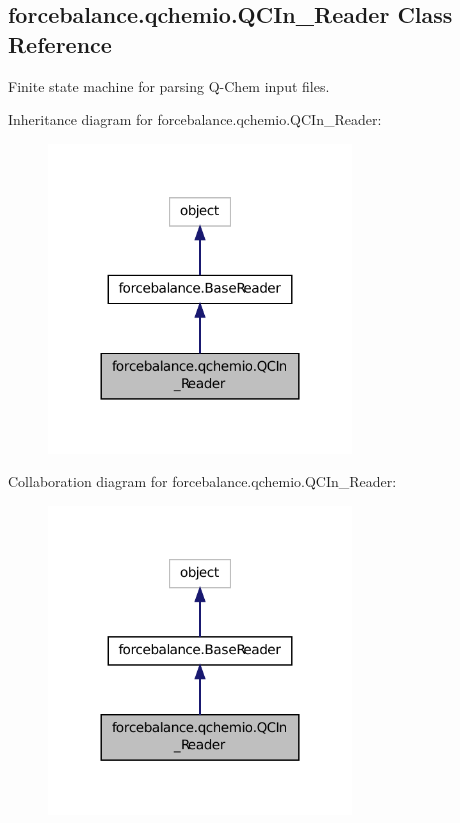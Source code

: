 \hypertarget{classforcebalance_1_1qchemio_1_1QCIn__Reader}{\subsection{forcebalance.\-qchemio.\-Q\-C\-In\-\_\-\-Reader Class Reference}
\label{classforcebalance_1_1qchemio_1_1QCIn__Reader}
}


Finite state machine for parsing Q-\/\-Chem input files.  




Inheritance diagram for forcebalance.\-qchemio.\-Q\-C\-In\-\_\-\-Reader\-:
\nopagebreak
\begin{figure}[H]
\begin{center}
\leavevmode
\includegraphics[width=228pt]{classforcebalance_1_1qchemio_1_1QCIn__Reader__inherit__graph}
\end{center}
\end{figure}


Collaboration diagram for forcebalance.\-qchemio.\-Q\-C\-In\-\_\-\-Reader\-:
\nopagebreak
\begin{figure}[H]
\begin{center}
\leavevmode
\includegraphics[width=228pt]{classforcebalance_1_1qchemio_1_1QCIn__Reader__coll__graph}
\end{center}
\end{figure}
